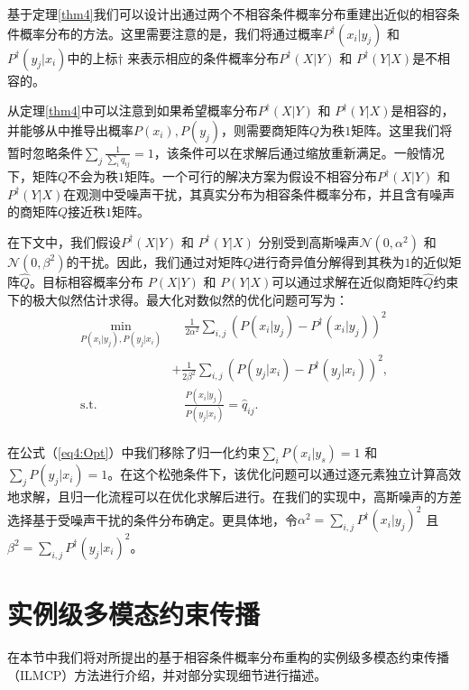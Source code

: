 基于定理\ref{thm4}我们可以设计出通过两个不相容条件概率分布重建出近似的相容条件概率分布的方法。这里需要注意的是，我们将通过概率$P^\dagger (x_i|y_j)$ 和 $P^\dagger (y_j|x_i)$中的上标$\dagger$ 来表示相应的条件概率分布$P^\dagger (X|Y)$ 和  $P^\dagger (Y|X)$是不相容的。

从定理\ref{thm4}中可以注意到如果希望概率分布$P^\dagger (X|Y)$ 和  $P^\dagger (Y|X)$是相容的，并能够从中推导出概率$P(x_i), P(y_j)$，则需要商矩阵$Q$为秩$1$矩阵。这里我们将暂时忽略条件$\sum_j\frac{1}{\sum_i {q}_{ij}} = 1$，该条件可以在求解后通过缩放重新满足。一般情况下，矩阵$Q$不会为秩$1$矩阵。一个可行的解决方案为假设不相容分布$P^\dagger (X|Y)$ 和  $P^\dagger (Y|X)$在观测中受噪声干扰，其真实分布为相容条件概率分布，并且含有噪声的商矩阵$Q$接近秩$1$矩阵。

在下文中，我们假设$P^\dagger(X|Y)$ 和 $P^\dagger(Y|X)$ 分别受到高斯噪声$ \mathcal{N}(0, \alpha^2) $ 和  $ \mathcal{N}(0, \beta^2) $的干扰。因此，我们通过对矩阵$Q$进行奇异值分解得到其秩为$1$的近似矩阵$\hat{{Q}}$。目标相容概率分布 $P(X|Y)$ 和  $P(Y|X)$可以通过求解在近似商矩阵$\hat{{Q}}$约束下的极大似然估计求得。最大化对数似然的优化问题可写为：
\begin{equation}
\begin{split}
\mathop{\mathrm{min}}_{P(x_i|y_j), P(y_j|x_i)} & \quad \frac{1}{2 \alpha^2} \sum_{i,j}(P(x_i|y_j)-P^\dagger(x_i|y_j))^2 \\
&+ \frac{1}{2 \beta^2} \sum_{i,j}(P(y_j|x_i)-P^\dagger(y_j|x_i))^2,\\
\mathrm{s.t.}\quad \quad \quad&\quad \frac{P(x_i|y_j)}{P(y_j|x_i)} = \hat{{q}}_{ij}.\\
\end{split}
\label{eq4:Opt}
\end{equation}

在公式（\ref{eq4:Opt}）中我们移除了归一化约束$\sum_{i}P(x_i|y_s) = 1$ 和  $\sum_{j}P(y_j|x_i) = 1$。在这个松弛条件下，该优化问题可以通过逐元素独立计算高效地求解，且归一化流程可以在优化求解后进行。在我们的实现中，高斯噪声的方差选择基于受噪声干扰的条件分布确定。更具体地，令$\alpha^2 = \sum_{i,j}P^\dagger(x_i|y_j)^2$ 且 $\beta^2 = \sum_{i,j}P^\dagger(y_j|x_i)^2$。

\section{实例级多模态约束传播}
在本节中我们将对所提出的基于相容条件概率分布重构的实例级多模态约束传播（ILMCP）方法进行介绍，并对部分实现细节进行描述。
